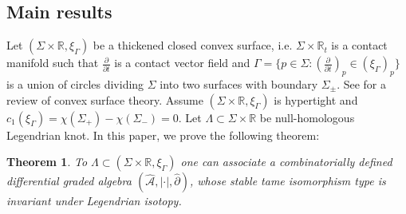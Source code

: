 \documentclass[11pt]{amsart}
\theoremstyle{mystyle}
\newtheorem{theorem}[theorem]{Theorem}
\newcommand{\R}{\mathbb{R}}
\newcommand{\<}{\langle}
\renewcommand{\>}{\rangle}
\begin{document}
\subsection{Main results}
Let $(\Sigma \times \R, \xi_\Gamma)$ be a thickened closed convex surface, i.e. $\Sigma \times \R_t$ is a contact manifold such that $\frac{\partial}{\partial t}$ is a contact vector field and $\Gamma = \{p \in \Sigma : (\frac{\partial}{\partial t})_p \in (\xi_\Gamma)_p\}$ is a union of circles dividing $\Sigma$ into two surfaces with boundary $\Sigma_\pm$. See  for a review of convex surface theory. Assume $(\Sigma\times \R,\xi_\Gamma)$ is hypertight and $c_1(\xi_\Gamma) = \chi(\Sigma_+) - \chi(\Sigma_-) = 0$. Let $\Lambda \subset \Sigma \times \R$ be null-homologous Legendrian knot.  %
In this paper, we prove the following theorem:

\begin{theorem}\label{thm: main 1} \it
    To $\Lambda \subset (\Sigma \times \R, \xi_\Gamma)$ one can associate a combinatorially defined differential graded algebra $(\widehat{\mathcal{A}},|\cdot|,\widehat{\partial})$, whose stable tame isomorphism type is invariant under Legendrian isotopy.
\end{theorem}
\end{document}
